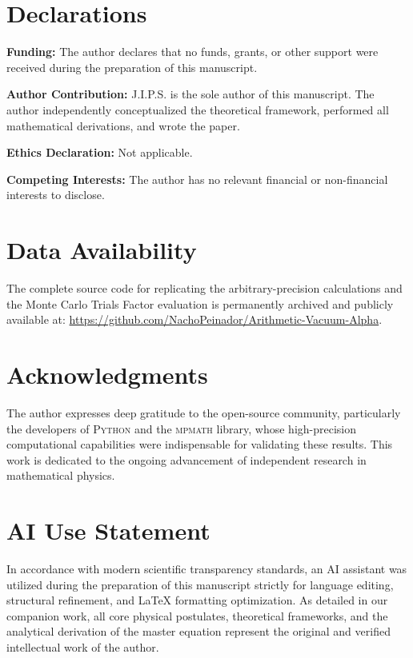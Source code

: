 \documentclass[12pt,a4paper]{article}
\begin{document}

\section*{Declarations}

\textbf{Funding:} The author declares that no funds, grants, or other support were received during the preparation of this manuscript.

\vspace{0.5em}
\noindent\textbf{Author Contribution:} J.I.P.S. is the sole author of this manuscript. The author independently conceptualized the theoretical framework, performed all mathematical derivations, and wrote the paper.

\vspace{0.5em}
\noindent\textbf{Ethics Declaration:} Not applicable.

\vspace{0.5em}
\noindent\textbf{Competing Interests:} The author has no relevant financial or non-financial interests to disclose.

\section*{Data Availability}
The complete source code for replicating the arbitrary-precision calculations and the Monte Carlo Trials Factor evaluation is permanently archived and publicly available at: \url{https://github.com/NachoPeinador/Arithmetic-Vacuum-Alpha}.

\section*{Acknowledgments}
The author expresses deep gratitude to the open-source community, particularly the developers of \textsc{Python} and the \textsc{mpmath} library, whose high-precision computational capabilities were indispensable for validating these results. This work is dedicated to the ongoing advancement of independent research in mathematical physics.

\section*{AI Use Statement}
In accordance with modern scientific transparency standards, an AI assistant was utilized during the preparation of this manuscript strictly for language editing, structural refinement, and LaTeX formatting optimization. As detailed in our companion work, all core physical postulates, theoretical frameworks, and the analytical derivation of the master equation represent the original and verified intellectual work of the author.
\end{document}
